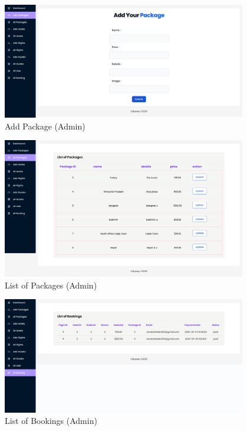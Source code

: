\begin{figure}[H]
    \centering
    \includegraphics[width=0.95\textwidth]{./figures/frontend/10.png}
    \caption{Add Package (Admin)}
    \label{fig:add_package_admin}
\end{figure}

\begin{figure}[H]
    \centering
    \includegraphics[width=0.95\textwidth]{./figures/frontend/11.png}
    \caption{List of Packages (Admin)}
    \label{fig:list_package_admin}
\end{figure}

\begin{figure}[H]
    \centering
    \includegraphics[width=0.95\textwidth]{./figures/frontend/12.png}
    \caption{List of Bookings (Admin)}
    \label{fig:list_bookings_admin}
\end{figure}
